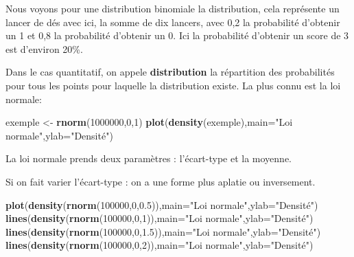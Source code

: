 \documentclass[
]{book}
\newenvironment{Shaded}{\begin{snugshade}}{\end{snugshade}}
\newcommand{\AttributeTok}[1]{\textcolor[rgb]{0.13,0.29,0.53}{#1}}
\newcommand{\DecValTok}[1]{\textcolor[rgb]{0.00,0.00,0.81}{#1}}
\newcommand{\FloatTok}[1]{\textcolor[rgb]{0.00,0.00,0.81}{#1}}
\newcommand{\FunctionTok}[1]{\textcolor[rgb]{0.13,0.29,0.53}{\textbf{#1}}}
\newcommand{\NormalTok}[1]{#1}
\newcommand{\OtherTok}[1]{\textcolor[rgb]{0.56,0.35,0.01}{#1}}
\newcommand{\StringTok}[1]{\textcolor[rgb]{0.31,0.60,0.02}{#1}}
\begin{document}
Nous voyons pour une distribution binomiale la distribution, cela représente
un lancer de dés avec ici, la somme de dix lancers, avec 0,2 la probabilité d'obtenir
un 1 et 0,8 la probabilité d'obtenir un 0. Ici la probabilité d'obtenir un score
de 3 est d'environ 20\%.

Dans le cas quantitatif, on appele \textbf{distribution} la répartition des
probabilités pour tous les points pour laquelle la distribution existe.
La plus connu est la loi normale:

\begin{Shaded}
\begin{Highlighting}[]
\NormalTok{exemple }\OtherTok{\textless{}{-}} \FunctionTok{rnorm}\NormalTok{(}\DecValTok{1000000}\NormalTok{,}\DecValTok{0}\NormalTok{,}\DecValTok{1}\NormalTok{)}
\FunctionTok{plot}\NormalTok{(}\FunctionTok{density}\NormalTok{(exemple),}\AttributeTok{main=}\StringTok{"Loi normale"}\NormalTok{,}\AttributeTok{ylab=}\StringTok{"Densité"}\NormalTok{)}
\end{Highlighting}
\end{Shaded}

La loi normale prends deux paramètres : l'écart-type et la moyenne.

Si on fait varier l'écart-type : on a une forme plus aplatie ou inversement.

\begin{Shaded}
\begin{Highlighting}[]
\FunctionTok{plot}\NormalTok{(}\FunctionTok{density}\NormalTok{(}\FunctionTok{rnorm}\NormalTok{(}\DecValTok{100000}\NormalTok{,}\DecValTok{0}\NormalTok{,}\FloatTok{0.5}\NormalTok{)),}\AttributeTok{main=}\StringTok{"Loi normale"}\NormalTok{,}\AttributeTok{ylab=}\StringTok{"Densité"}\NormalTok{)}
\FunctionTok{lines}\NormalTok{(}\FunctionTok{density}\NormalTok{(}\FunctionTok{rnorm}\NormalTok{(}\DecValTok{100000}\NormalTok{,}\DecValTok{0}\NormalTok{,}\DecValTok{1}\NormalTok{)),}\AttributeTok{main=}\StringTok{"Loi normale"}\NormalTok{,}\AttributeTok{ylab=}\StringTok{"Densité"}\NormalTok{)}
\FunctionTok{lines}\NormalTok{(}\FunctionTok{density}\NormalTok{(}\FunctionTok{rnorm}\NormalTok{(}\DecValTok{100000}\NormalTok{,}\DecValTok{0}\NormalTok{,}\FloatTok{1.5}\NormalTok{)),}\AttributeTok{main=}\StringTok{"Loi normale"}\NormalTok{,}\AttributeTok{ylab=}\StringTok{"Densité"}\NormalTok{)}
\FunctionTok{lines}\NormalTok{(}\FunctionTok{density}\NormalTok{(}\FunctionTok{rnorm}\NormalTok{(}\DecValTok{100000}\NormalTok{,}\DecValTok{0}\NormalTok{,}\DecValTok{2}\NormalTok{)),}\AttributeTok{main=}\StringTok{"Loi normale"}\NormalTok{,}\AttributeTok{ylab=}\StringTok{"Densité"}\NormalTok{)}
\end{Highlighting}
\end{Shaded}
\end{document}
